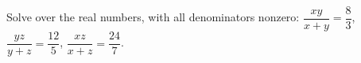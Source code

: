 Solve over the real numbers, with all denominators nonzero: $\dfrac{xy}{x+y}=\dfrac{8}{3}$, $\dfrac{yz}{y+z}=\dfrac{12}{5}$, $\dfrac{xz}{x+z}=\dfrac{24}{7}$.
